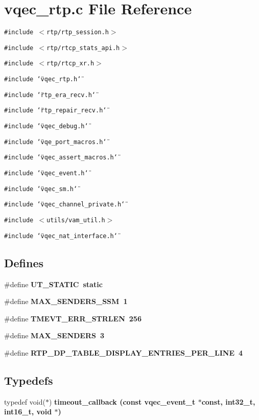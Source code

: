 \section{vqec\_\-rtp.c File Reference}
\label{vqec__rtp_8c}
{\tt \#include $<$rtp/rtp\_\-session.h$>$}\par
{\tt \#include $<$rtp/rtcp\_\-stats\_\-api.h$>$}\par
{\tt \#include $<$rtp/rtcp\_\-xr.h$>$}\par
{\tt \#include \char`\"{}vqec\_\-rtp.h\char`\"{}}\par
{\tt \#include \char`\"{}rtp\_\-era\_\-recv.h\char`\"{}}\par
{\tt \#include \char`\"{}rtp\_\-repair\_\-recv.h\char`\"{}}\par
{\tt \#include \char`\"{}vqec\_\-debug.h\char`\"{}}\par
{\tt \#include \char`\"{}vqe\_\-port\_\-macros.h\char`\"{}}\par
{\tt \#include \char`\"{}vqec\_\-assert\_\-macros.h\char`\"{}}\par
{\tt \#include \char`\"{}vqec\_\-event.h\char`\"{}}\par
{\tt \#include \char`\"{}vqec\_\-sm.h\char`\"{}}\par
{\tt \#include \char`\"{}vqec\_\-channel\_\-private.h\char`\"{}}\par
{\tt \#include $<$utils/vam\_\-util.h$>$}\par
{\tt \#include \char`\"{}vqec\_\-nat\_\-interface.h\char`\"{}}\par
\subsection*{Defines}
\begin{CompactItemize}
\item 
\#define \bf{UT\_\-STATIC}~static
\item 
\#define \bf{MAX\_\-SENDERS\_\-SSM}~1
\item 
\#define \bf{TMEVT\_\-ERR\_\-STRLEN}~256
\item 
\#define \bf{MAX\_\-SENDERS}~3
\item 
\#define \bf{RTP\_\-DP\_\-TABLE\_\-DISPLAY\_\-ENTRIES\_\-PER\_\-LINE}~4
\end{CompactItemize}
\subsection*{Typedefs}
\begin{CompactItemize}
\item 
typedef void($\ast$) \bf{timeout\_\-callback} (const vqec\_\-event\_\-t $\ast$const, int32\_\-t, int16\_\-t, void $\ast$)
\end{CompactItemize}
